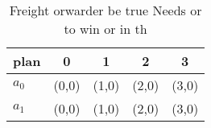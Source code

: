 \documentclass[a4paper]{article}
\begin{document}
\begin{table}
\begin{adjustbox}{width=0.8\columnwidth}
\begin{tabular}{|l|l|l|l|l|}
\hline
\textbf{plan} & \multicolumn{1}{c|}{\textbf{0}} & \multicolumn{1}{c|}{\textbf{1}} & \multicolumn{1}{c|}{\textbf{2}} & \multicolumn{1}{c|}{\textbf{3}} \\ \hline
\textbf{$a_0$}  & (0,0) & (1,0) & (2,0) & (3,0) \\ \hline
\textbf{$a_1$}  & (0,0) & (1,0) & (2,0) & (3,0) \\ \hline
\end{tabular}
\end{adjustbox}
\caption{Freight orwarder be true Needs or to win or in th
}
\end{table}
\end{document}
